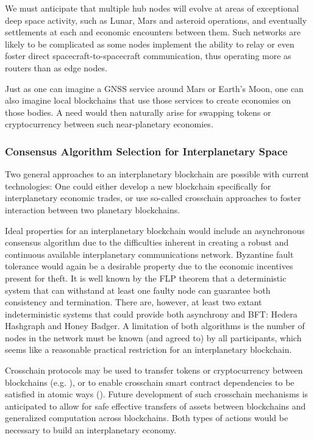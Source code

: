 \documentclass[]{aiaa-tc}%
\begin{document}
We must anticipate that multiple hub nodes will evolve at areas of exceptional deep space activity, such as Lunar, Mars and asteroid operations, and eventually settlements at each and economic encounters between them. Such networks are likely to be complicated as some nodes implement the ability to relay or even foster direct spacecraft-to-spacecraft communication, thus operating more as routers than as edge nodes.

Just as one can imagine a GNSS service around Mars or Earth's Moon, one can also imagine local blockchains that use those services to create economies on those bodies. A need would then naturally arise for swapping tokens or cryptocurrency between such near-planetary economies.

\subsubsection{Consensus Algorithm Selection for Interplanetary Space}

Two general approaches to an interplanetary blockchain are possible with current technologies: One could either develop a new blockchain specifically for interplanetary economic trades, or use so-called crosschain approaches to foster interaction between two planetary blockchains.

Ideal properties for an interplanetary blockchain would include an asynchronous consensus algorithm due to the difficulties inherent in creating a robust and continuous available interplanetary communications network. Byzantine fault tolerance would again be a desirable property due to the economic incentives present for theft. It is well known by the FLP theorem\cite{fischer1982impossibility} that a deterministic system that can withstand at least one faulty node can guarantee both consistency and termination. There are, however, at least two extant indeterministic systems that could provide both asynchrony and BFT: Hedera Hashgraph\cite{baird2018hedera} and Honey Badger\cite{Miller_Xia_Croman_Shi_Song_2016}. A limitation of both algorithms is the number of nodes in the network must be known (and agreed to) by all participants, which seems like a reasonable practical restriction for an interplanetary blockchain.

Crosschain protocols may be used to transfer tokens or cryptocurrency between blockchains (e.g. \cite{thomas2015protocol,sporny-web-ledger-2019}), or to enable crosschain smart contract dependencies to be satisfied in atomic ways (\cite{robinson2019atomic}). Future development of such crosschain mechanisms is anticipated to allow for safe effective transfers of assets between blockchains and generalized computation across blockchains. Both types of actions would be necessary to build an interplanetary economy.
\end{document}
